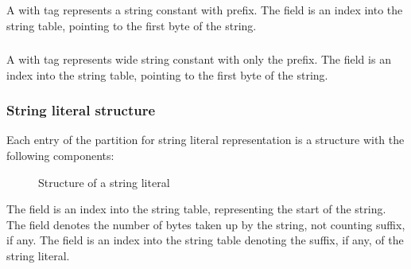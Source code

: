 \subsubsection{}
A  with tag   represents a  string constant with  prefix.
The  field is an index into the string table, pointing to the first byte of the string.


\subsubsection{}

A  with tag   represents wide string constant with only the  prefix.
The  field is an index into the string table, pointing to the first byte of the string.


\subsubsection{String literal structure}
Each entry of the partition for string literal representation is a structure with the following components:
%
\begin{figure}[H]
	\centering
	\caption{Structure of a string literal}
	\label{fig:ifc-string-literal-structure}
\end{figure}
%
The  field is an index into the string table, representing the start of the string.
The  field denotes the number of bytes taken up by the string, not counting suffix, if any.
The  field is an index into the string table denoting the suffix, if any, of the string literal.


\subsection{}
\label{sec:ifc:ExprSort:Temporary}

